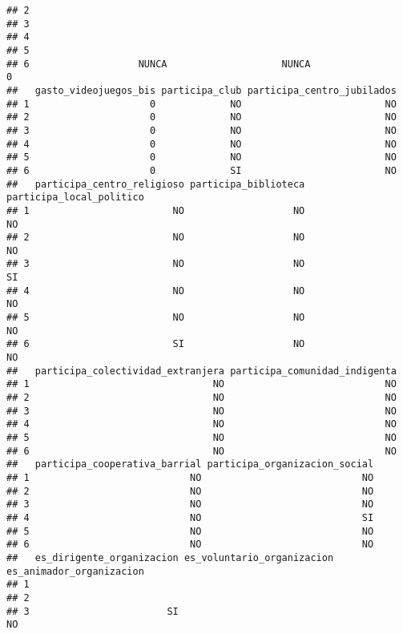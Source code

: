 \documentclass[
]{article}
\begin{document}
\begin{verbatim}
## 2                                                                   
## 3                                                                   
## 4                                                                   
## 5                                                                   
## 6                   NUNCA                    NUNCA                 0
##   gasto_videojuegos_bis participa_club participa_centro_jubilados
## 1                     0             NO                         NO
## 2                     0             NO                         NO
## 3                     0             NO                         NO
## 4                     0             NO                         NO
## 5                     0             NO                         NO
## 6                     0             SI                         NO
##   participa_centro_religioso participa_biblioteca participa_local_politico
## 1                         NO                   NO                       NO
## 2                         NO                   NO                       NO
## 3                         NO                   NO                       SI
## 4                         NO                   NO                       NO
## 5                         NO                   NO                       NO
## 6                         SI                   NO                       NO
##   participa_colectividad_extranjera participa_comunidad_indigenta
## 1                                NO                            NO
## 2                                NO                            NO
## 3                                NO                            NO
## 4                                NO                            NO
## 5                                NO                            NO
## 6                                NO                            NO
##   participa_cooperativa_barrial participa_organizacion_social
## 1                            NO                            NO
## 2                            NO                            NO
## 3                            NO                            NO
## 4                            NO                            SI
## 5                            NO                            NO
## 6                            NO                            NO
##   es_dirigente_organizacion es_voluntario_organizacion es_animador_organizacion
## 1                                                                              
## 2                                                                              
## 3                        SI                                                  NO

\end{verbatim}
\end{document}
